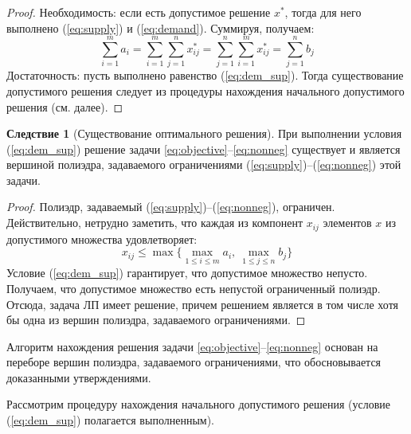\documentclass[12pt]{article}
\theoremstyle{definition}
\theoremstyle{plain}
\theoremstyle{definition}
\begin{document}
\begin{proof}
  Необходимость: если есть допустимое решение $x^*$, тогда для него выполнено (\ref{eq:supply}) и (\ref{eq:demand}). Суммируя, получаем:
  $$ \sum_{i=1}^{m} a_i = \sum_{i=1}^{m} \sum_{j=1}^{n} x^*_{ij} =
  \sum_{j=1}^{n} \sum_{i=1}^{m} x^*_{ij} = \sum_{j=1}^{n} b_j$$
  Достаточность: пусть выполнено равенство (\ref{eq:dem_sup}).
  Тогда существование допустимого решения следует из процедуры нахождения
  начального допустимого решения (см. далее).
\end{proof}

\newtheorem{corollarylocal}{Следствие}
\begin{corollarylocal}[Существование оптимального решения]
При выполнении условия (\ref{eq:dem_sup})
решение задачи \eqref{eq:objective}--\eqref{eq:nonneg} существует и является вершиной
полиэдра, задаваемого ограничениями (\ref{eq:supply})--(\ref{eq:nonneg}) этой задачи.
\end{corollarylocal}

\begin{proof}
  Полиэдр, задаваемый (\ref{eq:supply})--(\ref{eq:nonneg}), ограничен. Действительно, нетрудно заметить, что каждая из компонент $x_{ij}$
  элементов $x$ из допустимого множества удовлетворяет:
  $$x_{ij} \leq \max\{\max_{1 \leq i \leq m} a_i, \:\max_{1 \leq j \leq n} b_j\}$$
  Условие (\ref{eq:dem_sup}) гарантирует, что допустимое множество непусто.
  Получаем, что допустимое множество есть непустой ограниченный полиэдр.
  Отсюда, задача ЛП имеет решение, причем решением
  является в том числе хотя бы одна из вершин полиэдра, задаваемого ограничениями.
\end{proof}

Алгоритм нахождения решения задачи \eqref{eq:objective}--\eqref{eq:nonneg}
основан на переборе вершин полиэдра, задаваемого ограничениями,
что обосновывается доказанными утверждениями.

Рассмотрим процедуру нахождения начального допустимого решения\cite{conf1}
(условие (\ref{eq:dem_sup}) полагается выполненным).
\end{document}
